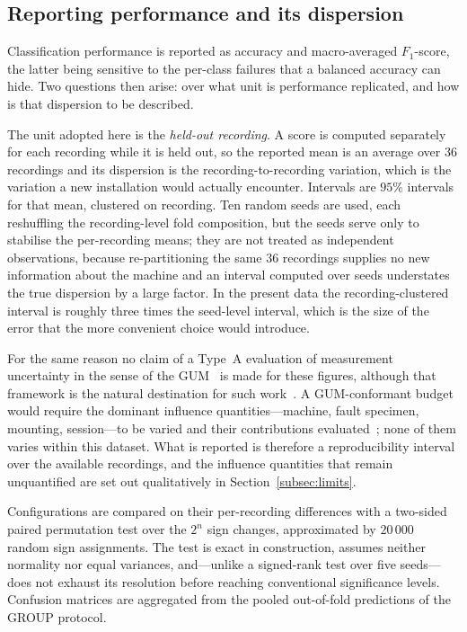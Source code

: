 \subsection{Reporting performance and its dispersion}
\label{subsec:stats}
Classification performance is reported as accuracy and macro-averaged
$F_1$-score, the latter being sensitive to the per-class failures that a balanced
accuracy can hide. Two questions then arise: over what unit is performance
replicated, and how is that dispersion to be described.

The unit adopted here is the \emph{held-out recording}. A score is computed
separately for each recording while it is held out, so the reported mean is an
average over $36$ recordings and its dispersion is the recording-to-recording
variation, which is the variation a new installation would actually encounter.
Intervals are $95\%$ intervals for that mean, clustered on recording. Ten random
seeds are used, each reshuffling the recording-level fold composition, but the
seeds serve only to stabilise the per-recording means; they are not treated as
independent observations, because re-partitioning the same $36$ recordings
supplies no new information about the machine and an interval computed over seeds
understates the true dispersion by a large factor. In the present data the
recording-clustered interval is roughly three times the seed-level interval, which
is the size of the error that the more convenient choice would introduce.

For the same reason no claim of a Type~A evaluation of measurement uncertainty in
the sense of the GUM~\cite{jcgm2008gum} is made for these figures, although that
framework is the natural destination for such work~\cite{angrisani2025uncertainty,
dorozhovets2020uncertainty}. A GUM-conformant budget would require the dominant
influence quantities---machine, fault specimen, mounting, session---to be varied
and their contributions evaluated~\cite{staszewski2025mems}; none of them varies
within this dataset. What is reported is therefore a reproducibility interval over
the available recordings, and the influence quantities that remain unquantified
are set out qualitatively in Section~\ref{subsec:limits}.

Configurations are compared on their per-recording differences with a two-sided
paired permutation test over the $2^{n}$ sign changes, approximated by $20\,000$
random sign assignments. The test is exact in construction, assumes neither
normality nor equal variances, and---unlike a signed-rank test over five
seeds---does not exhaust its resolution before reaching conventional significance
levels. Confusion matrices are aggregated from the pooled out-of-fold predictions
of the GROUP protocol.

